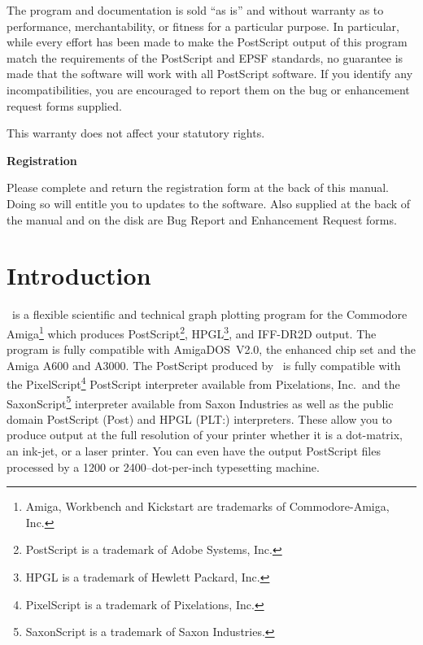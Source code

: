 The program and documentation is sold ``as is'' and without warranty as to 
performance, merchantability, or fitness for a particular purpose. In particular,
while every effort has been made to make the PostScript output of this program
match the requirements of the PostScript and EPSF standards, no guarantee is made
that the software will work with all PostScript software. If you identify any
incompatibilities, you are encouraged to report them on the bug or enhancement
request forms supplied.

This warranty does not affect your statutory rights.

\vspace*{1em}
\begin{center}
\Large\bf Registration
\end{center}
\vspace*{1ex}
Please complete and return the registration
form at the back of this manual.
Doing so will entitle you to updates to the software. Also supplied at the back 
of the manual and on the disk are Bug Report and Enhancement Request forms.

\tableofcontents

\chapter{Introduction}
\amplot\ is a flexible scientific and technical graph plotting program for the 
Commodore Amiga\footnote{Amiga, Workbench and Kickstart are trademarks of 
Commodore-Amiga, Inc.}
which produces PostScript\footnote{PostScript is a trademark of Adobe Systems, Inc.},
HPGL\footnote{HPGL is a trademark of Hewlett Packard, Inc.},
and IFF-DR2D output.
%
The program is fully compatible with AmigaDOS~V2.0, the enhanced 
chip set and the Amiga A600 and A3000.
%
The PostScript produced by \amplot\ is fully compatible with the 
PixelScript\footnote{PixelScript is a trademark of Pixelations, Inc.} 
PostScript interpreter available from Pixelations, Inc.\ 
and the SaxonScript\footnote{SaxonScript is a trademark of Saxon Industries.}
interpreter available from Saxon Industries 
as well as the public domain PostScript (Post) and HPGL (PLT:) 
interpreters. 
These allow you to produce output at the full resolution of your printer whether 
it is a dot-matrix, an ink-jet, or a laser printer. 
You can even have the output PostScript files processed by a 1200 or 
2400--dot-per-inch typesetting machine.

